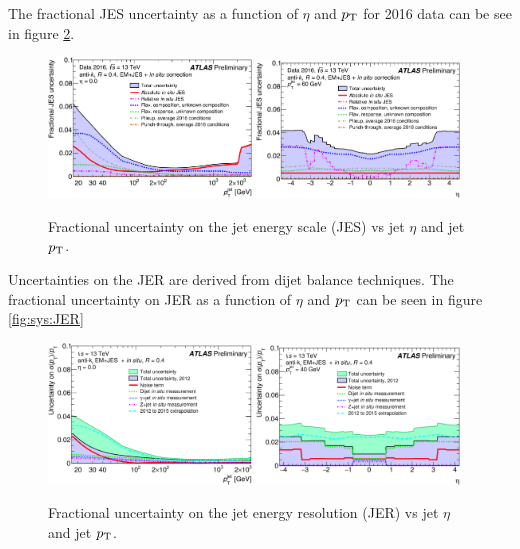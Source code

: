 \indent The fractional JES uncertainty as a function of $\eta$ and $p_{\mathrm{T}}$ for 2016 data can be see in figure \ref{fig:sys:JES}. \\

\begin{figure}[!htbp]
\begin{center}
\includegraphics[width=0.48\textwidth]{figures/JetCalib/JES_pt.png}
\includegraphics[width=0.48\textwidth]{figures/JetCalib/JES_eta.png}
\caption{Fractional uncertainty on the jet energy scale (JES) vs jet $\eta$ and jet $p_{\mathrm{T}}$.  }
\label{fig:sys:JES}
\end{center}
\end{figure}

\indent Uncertainties on the JER are derived from dijet balance techniques.\cite{JES_dijet}  The fractional uncertainty on JER as a function of $\eta$ and $p_{\mathrm{T}}$ can be seen in figure \ref{fig:sys:JER}\\

\begin{figure}[!htbp]
\begin{center}
\includegraphics[width=0.48\textwidth]{figures/JetCalib/JER_pt.png}
\includegraphics[width=0.48\textwidth]{figures/JetCalib/JER_eta.png}
\caption{Fractional uncertainty on the jet energy resolution (JER) vs jet $\eta$ and jet $p_{\mathrm{T}}$.  }
\label{fig:sys:JES}
\end{center}
\end{figure}

